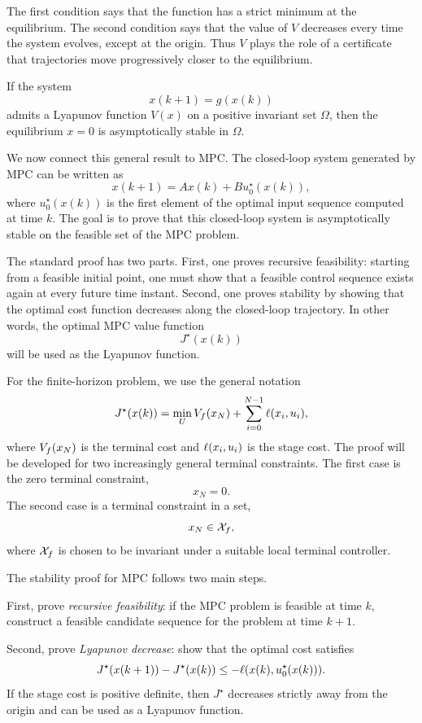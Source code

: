 The first condition says that the function has a strict minimum at the equilibrium. The second
condition says that the value of \(V\) decreases every time the system evolves, except at the
origin. Thus \(V\) plays the role of a certificate that trajectories move progressively closer to
the equilibrium.

\begin{theorembox}
If the system
\[
    x(k+1)=g(x(k))
\]
admits a Lyapunov function \(V(x)\) on a positive invariant set \(\Omega\), then the equilibrium
\(x=0\) is asymptotically stable in \(\Omega\).
\end{theorembox}

We now connect this general result to MPC. The closed-loop system generated by MPC can be
written as
\[
    x(k+1)=Ax(k)+Bu_0^\star(x(k)),
\]
where \(u_0^\star(x(k))\) is the first element of the optimal input sequence computed at time
\(k\). The goal is to prove that this closed-loop system is asymptotically stable on the feasible
set of the MPC problem.

The standard proof has two parts. First, one proves recursive feasibility: starting from a
feasible initial point, one must show that a feasible control sequence exists again at every
future time instant. Second, one proves stability by showing that the optimal cost function
decreases along the closed-loop trajectory. In other words, the optimal MPC value function
\[
    J^\star(x(k))
\]
will be used as the Lyapunov function.

For the finite-horizon problem, we use the general notation
\[
    J^\star(x(k))
    =
    \min_U
    V_f(x_N)
    +
    \sum_{i=0}^{N-1}\ell(x_i,u_i),
\]
where \(V_f(x_N)\) is the terminal cost and
\(\ell(x_i,u_i)\) is the stage cost. The proof will be developed for two increasingly
general terminal constraints. The first case is the zero terminal constraint,
\[
    x_N=0.
\]
The second case is a terminal constraint in a set,
\[
    x_N\in\mathcal{X}_f,
\]
where \(\mathcal{X}_f\) is chosen to be invariant under a suitable local terminal controller.

\begin{theorembox}
The stability proof for MPC follows two main steps.

First, prove \emph{recursive feasibility}: if the MPC problem is feasible at time \(k\), construct
a feasible candidate sequence for the problem at time \(k+1\).

Second, prove \emph{Lyapunov decrease}: show that the optimal cost satisfies
\[
    J^\star(x(k+1))-J^\star(x(k)) \leq -\ell(x(k),u_0^\star(x(k))).
\]
If the stage cost is positive definite, then \(J^\star\) decreases strictly away from the origin
and can be used as a Lyapunov function.
\end{theorembox}

